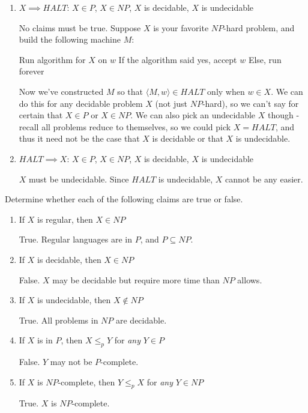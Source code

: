 \documentclass[fleqn]{article}
\begin{document}
\begin{enumerate}
\begin{answer}
    \end{answer}
    \item $X \implies HALT$: $X \in P$, $X \in NP$, $X$ is decidable, $X$ is undecidable
    \begin{answer}
        No claims must be true. Suppose $X$ is your favorite $NP$-hard problem, and build the following machine $M$:
        \begin{algorithmic}
                \State Run algorithm for $X$ on $w$
                \State If the algorithm said yes, accept $w$
                \State Else, run forever
            \EndFunction
        \end{algorithmic}
        Now we've constructed $M$ so that $\langle M, w \rangle \in HALT$ only when $w \in X$. We can do this for any decidable problem $X$ (not just $NP$-hard), so we can't say for certain that $X \in P$ or $X \in NP$. We can also pick an undecidable $X$ though - recall all problems reduce to themselves, so we could pick $X = HALT$, and thus it need not be the case that $X$ is decidable or that $X$ is undecidable.
    \end{answer}
    \item $HALT \implies X$: $X \in P$, $X \in NP$, $X$ is decidable, $X$ is undecidable
    \begin{answer}
        $X$ must be undecidable. Since $HALT$ is undecidable, $X$ cannot be any easier.
    \end{answer}
\end{enumerate}

\noindent Determine whether each of the following claims are true or false.
\begin{enumerate}
    \item If $X$ is regular, then $X \in NP$
    \begin{answer}
        True. Regular languages are in $P$, and $P \subseteq NP$.
    \end{answer}
    \item If $X$ is decidable, then $X \in NP$
    \begin{answer}
        False. $X$ may be decidable but require more time than $NP$ allows.
    \end{answer}
    \item If $X$ is undecidable, then $X \notin NP$
    \begin{answer}
        True. All problems in $NP$ are decidable.
    \end{answer}
    \item If $X$ is in $P$, then $X \leq_p Y$ for \textit{any} $Y \in P$
    \begin{answer}
        False. $Y$ may not be $P$-complete.
    \end{answer}
    \item If $X$ is $NP$-complete, then $Y \leq_p X$ for \textit{any} $Y \in NP$
    \begin{answer}
        True. $X$ is $NP$-complete.
    \end{answer}
\end{enumerate}
\end{document}
